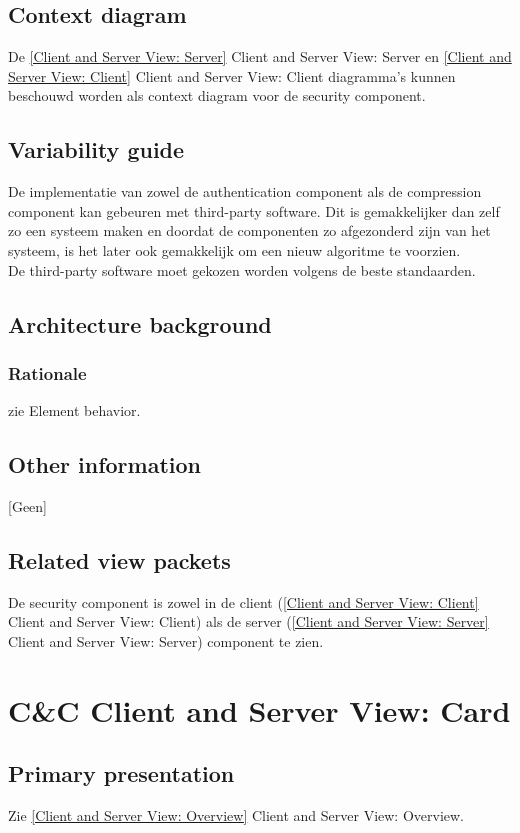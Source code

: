 \documentclass[a4paper,10pt]{article}
\begin{document}
\subsection{Context diagram}
De \ref{Client and Server View: Server} Client and Server View: Server en \ref{Client and Server View: Client} Client and Server View: Client diagramma's kunnen beschouwd worden als context diagram voor de security component.

\subsection{Variability guide}
De implementatie van zowel de authentication component als de compression component kan gebeuren met third-party software. Dit is gemakkelijker dan zelf zo een systeem maken en doordat de componenten zo afgezonderd zijn van het systeem, is het later ook gemakkelijk om een nieuw algoritme te voorzien.\\
De third-party software moet gekozen worden volgens de beste standaarden.

\subsection{Architecture background}

\subsubsection*{Rationale}
zie Element behavior.

\subsection{Other information}
[Geen]

\subsection{Related view packets}
De security component is zowel in de client (\ref{Client and Server View: Client} Client and Server View: Client) als de server (\ref{Client and Server View: Server} Client and Server View: Server) component te zien.


\clearpage
\section{C\&C Client and Server View: Card}
\label{Client and Server View: Card}

\subsection{Primary presentation}
Zie \ref{Client and Server View: Overview} Client and Server View: Overview.
\end{document}
